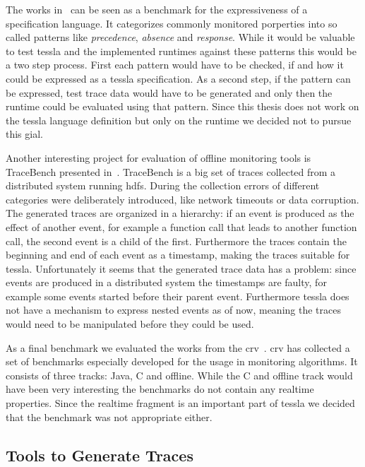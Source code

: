 The works in~\cite{Dwyer1999} can be seen as a benchmark for the expressiveness of a specification language.
It categorizes commonly monitored porperties into so called patterns like \emph{precedence}, \emph{absence} and \emph{response}.
While it would be valuable to test \gls{tessla} and the implemented runtimes against these patterns this would be a two step process.
First each pattern would have to be checked, if and how it could be expressed as a \gls{tessla} specification.
As a second step, if the pattern can be expressed, test trace data would have to be generated and only then the runtime could be evaluated using that pattern.
Since this thesis does not work on the \gls{tessla} language definition but only on the runtime we decided not to pursue this gial.

Another interesting project for evaluation of offline monitoring tools is TraceBench presented in~\cite{Zhou2014}.
TraceBench is a big set of traces collected from a distributed system running \gls{hdfs}.
During the collection errors of different categories were deliberately introduced, like network timeouts or data corruption.
The generated traces are organized in a hierarchy: if an event is produced as the effect of another event, for example a function call that leads to another function call, the second event is a child of the first.
Furthermore the traces contain the beginning and end of each event as a timestamp, making the traces suitable for \gls{tessla}.
Unfortunately it seems that the generated trace data has a problem: since events are produced in a distributed system the timestamps are faulty, for example some events started before their parent event.
Furthermore \gls{tessla} does not have a mechanism to express nested events as of now, meaning the traces would need to be manipulated before they could be used.

As a final benchmark we evaluated the works from the \gls{crv}~\citep{Reger2016}.
\Gls{crv} has collected a set of benchmarks especially developed for the usage in monitoring algorithms.
It consists of three tracks: Java, C and offline.
While the C and offline track would have been very interesting the benchmarks do not contain any realtime properties.
Since the realtime fragment is an important part of \gls{tessla} we decided that the benchmark was not appropriate either.

\subsection{Tools to Generate Traces}

